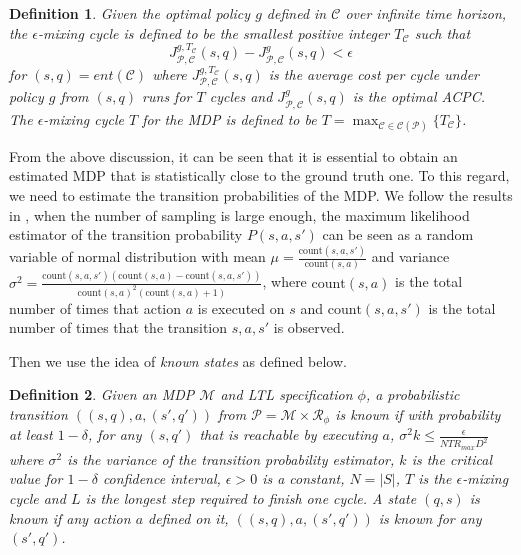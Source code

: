 \documentclass[journal]{IEEEtran}
\newtheorem{definition}{Definition}
\begin{document}
\begin{definition}
	Given the optimal policy $g$ defined in $\mathcal{C}$ over infinite time horizon, the $\epsilon$-mixing cycle  is defined to be the smallest positive integer $T_\mathcal{C}$ such that
	$$
	J^{g,T_\mathcal{C}}_{\mathcal{P},\mathcal{C}}(s,q)-J^{g}_{\mathcal{P},\mathcal{C}}(s,q)<\epsilon
	$$ 
	for $(s,q)=ent(\mathcal{C})$ where $J^{g,T_\mathcal{C}}_{\mathcal{P},\mathcal{C}}(s,q)
	$ is the average cost per cycle under policy $g$ from $(s,q)$ runs for $T$ cycles
	and $J^{g}_{\mathcal{P},\mathcal{C}}(s,q)$ is the optimal ACPC. The $\epsilon$-mixing cycle $T$ for the MDP is defined to be $T=\max_{\mathcal{C}\in\mathcal{C}(\mathcal{P})}\{T_\mathcal{C}\}$.
\end{definition}

From the above discussion, it can be seen that it is essential to obtain an estimated MDP that is statistically close to the ground truth one. To this regard, we need to estimate the transition probabilities of the MDP. We follow the results in \cite{Fu-RSS-14}, when the number of sampling is large enough, the maximum likelihood estimator of the transition probability $P(s,a,s')$ can be seen as a random variable of normal distribution with mean $\mu = \frac{\text{count}(s,a,s')}{\text{count}(s,a)}$ and variance $\sigma^2 = \frac{\text{count}(s,a,s')(\text{count}(s,a)-\text{count}(s,a,s'))}{\text{count}(s,a)^2(\text{count}(s,a)+1)}$, where $\text{count}(s,a)$ is the total number of times that action $a$ is executed on $s$ and $\text{count}(s,a,s')$ is the total number of times that the transition $s,a,s'$ is observed.

Then we use the idea of \emph{known states} \cite{brafman2002r,Fu-RSS-14,kearns2002near} as defined below. 

\begin{definition}\label{def:known}
	Given an MDP $\mathcal{M}$ and LTL specification $\phi$, a probabilistic transition $((s,q),a,(s',q'))$ from $\mathcal{P}=\mathcal{M}\times\mathcal{R}_\phi$ is known if with probability at least $1-\delta$, for any $(s,q')$ that is reachable by executing $a$, $\sigma^2 k\leq\frac{\epsilon}{NTR_{max}D^2}$ where $\sigma^2$ is the variance of the transition probability estimator, $k$ is the critical value for $1-\delta$ confidence interval, $\epsilon>0$ is a constant, $N=|S|$, $T$ is the $\epsilon$-mixing cycle and $L$ is the longest step required to finish one cycle. A state $(q,s)$ is known if any action $a$ defined on it, $((s,q),a,(s',q'))$ is known for any $(s',q')$. 
\end{definition}
\end{document}
